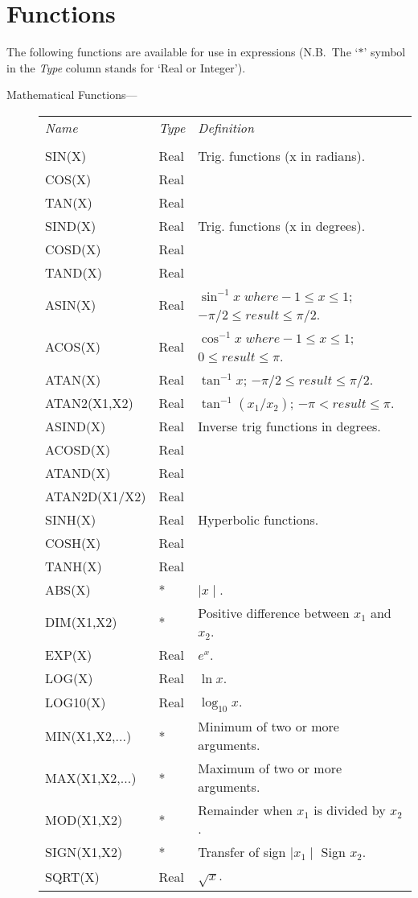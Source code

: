 \section{Functions}

The following functions are available for use in expressions (N.B.\ The `$*$'
symbol in the {\em Type} column stands for `Real or Integer').

\begin{description}

\item [Mathematical Functions--- ]

\begin{tabular}{l l l}
{\em Name} & {\em Type} & {\em Definition} \\
\\
SIN(X) & Real & Trig. functions (x in radians). \\
COS(X) & Real \\
TAN(X) & Real \\
SIND(X) & Real & Trig. functions (x in degrees). \\
COSD(X) & Real \\
TAND(X) & Real \\
ASIN(X) & Real & $\sin^{-1} x \; where -1 \leq x \leq 1 $;
 $ -\pi/2 \leq result \leq \pi/2$.\\
ACOS(X) & Real & $\cos^{-1} x \; where -1 \leq x \leq 1 $;
 $ 0 \leq result \leq \pi$.\\
ATAN(X) & Real & $\tan^{-1} x $; $ -\pi/2 \leq result \leq \pi/2$.\\
ATAN2(X1,X2) & Real & $\tan^{-1} (x_{1}/x_{2}) $; $ -\pi < result \leq \pi $.\\
ASIND(X) & Real & Inverse trig functions in degrees. \\
ACOSD(X) & Real \\
ATAND(X) & Real \\
ATAN2D(X1/X2) & Real \\
SINH(X) & Real & Hyperbolic functions. \\
COSH(X) & Real \\
TANH(X) & Real \\
ABS(X) & * & $\mid x \mid$.\\
DIM(X1,X2) & * & Positive difference between $x_1$ and $x_2$. \\
EXP(X) & Real & $e^{x}$. \\
LOG(X) & Real & $\ln x$.\\
LOG10(X) & Real & $\log_{10} x $.\\
MIN(X1,X2,...) & * & Minimum of two or more arguments. \\
MAX(X1,X2,...) & * & Maximum of two or more arguments. \\
MOD(X1,X2) & * & Remainder when $x_1$ is divided by $x_2$. \\
SIGN(X1,X2) & * & Transfer of sign $\mid x_1 \mid$ Sign $x_2$. \\
SQRT(X) & Real & $\sqrt{x}$.\\
\end{tabular}


\end{description}
